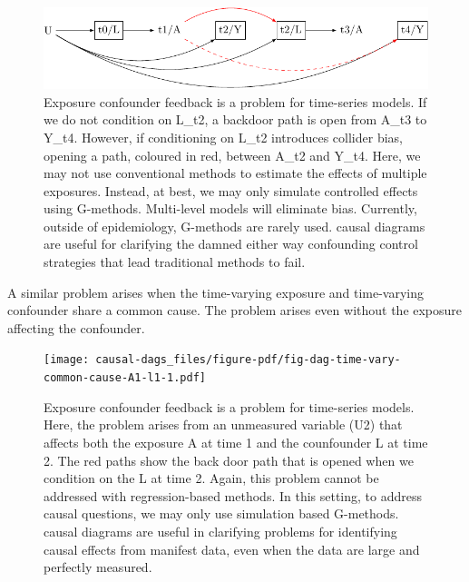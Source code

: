 \documentclass[
  singlecolumn]{report}
\begin{document}
\begin{figure}

{\centering \includegraphics[width=1\textwidth,height=\textheight]{causal-dags_files/figure-pdf/fig-dag-9-1.pdf}

}

\caption{\label{fig-dag-9}Exposure confounder feedback is a problem for
time-series models. If we do not condition on L\_t2, a backdoor path is
open from A\_t3 to Y\_t4. However, if conditioning on L\_t2 introduces
collider bias, opening a path, coloured in red, between A\_t2 and Y\_t4.
Here, we may not use conventional methods to estimate the effects of
multiple exposures. Instead, at best, we may only simulate controlled
effects using G-methods. Multi-level models will eliminate bias.
Currently, outside of epidemiology, G-methods are rarely used. causal
diagrams are useful for clarifying the damned either way confounding
control strategies that lead traditional methods to fail.}

\end{figure}

A similar problem arises when the time-varying exposure and time-varying
confounder share a common cause. The problem arises even without the
exposure affecting the confounder.

\begin{figure}

{\centering \texttt{[image: causal-dags\_files/figure-pdf/fig-dag-time-vary-common-cause-A1-l1-1.pdf]}

}

\caption{\label{fig-dag-time-vary-common-cause-A1-l1}Exposure confounder
feedback is a problem for time-series models. Here, the problem arises
from an unmeasured variable (U2) that affects both the exposure A at
time 1 and the counfounder L at time 2. The red paths show the back door
path that is opened when we condition on the L at time 2. Again, this
problem cannot be addressed with regression-based methods. In this
setting, to address causal questions, we may only use simulation based
G-methods. causal diagrams are useful in clarifying problems for
identifying causal effects from manifest data, even when the data are
large and perfectly measured.}

\end{figure}
\end{document}
